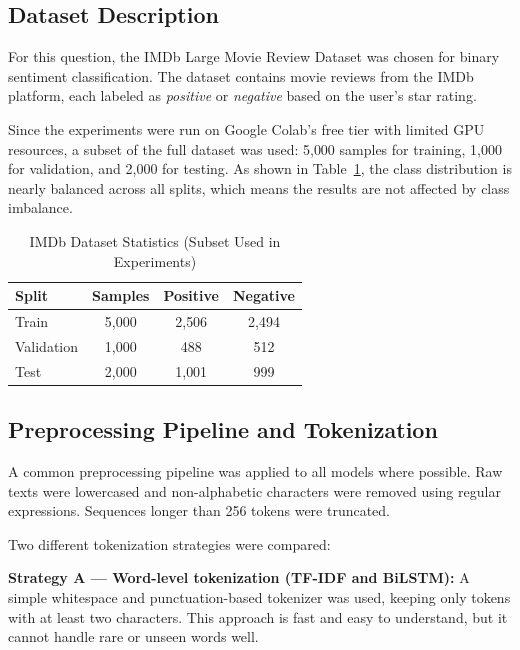 \documentclass[12pt,a4paper]{article}
\begin{document}
\subsection{Dataset Description}

For this question, the IMDb Large Movie Review Dataset \cite{maas2011imdb} was
chosen for binary sentiment classification. The dataset contains movie reviews
from the IMDb platform, each labeled as \textit{positive} or \textit{negative}
based on the user's star rating.

Since the experiments were run on Google Colab's free tier with limited GPU
resources, a subset of the full dataset was used: 5{,}000 samples for training,
1{,}000 for validation, and 2{,}000 for testing. As shown in
Table~\ref{tab:q1_dataset}, the class distribution is nearly balanced across
all splits, which means the results are not affected by class imbalance.

\begin{table}[H]
    \centering
    \caption{IMDb Dataset Statistics (Subset Used in Experiments)}
    \begin{tabular}{lccc}
        \toprule
        \textbf{Split} & \textbf{Samples} & \textbf{Positive} & \textbf{Negative} \\
        \midrule
        Train      & 5{,}000 & 2{,}506 & 2{,}494 \\
        Validation & 1{,}000 &    488  &    512  \\
        Test       & 2{,}000 & 1{,}001 &    999  \\
        \bottomrule
    \end{tabular}
    \label{tab:q1_dataset}
\end{table}

\subsection{Preprocessing Pipeline and Tokenization}

A common preprocessing pipeline was applied to all models where possible.
Raw texts were lowercased and non-alphabetic characters were removed using
regular expressions. Sequences longer than 256 tokens were truncated.

Two different tokenization strategies were compared:

\textbf{Strategy A — Word-level tokenization (TF-IDF and BiLSTM):}
A simple whitespace and punctuation-based tokenizer was used, keeping only
tokens with at least two characters. This approach is fast and easy to
understand, but it cannot handle rare or unseen words well.
\end{document}
